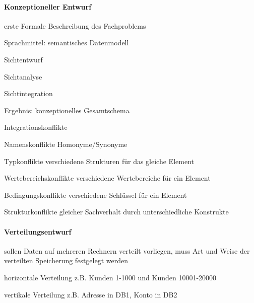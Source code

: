 \documentclass[a4paper]{article}
\begin{document}
\begin{multicols}{3}
    \paragraph{Konzeptioneller Entwurf}
    \begin{itemize*}
        \item erste Formale Beschreibung des Fachproblems
        \item Sprachmittel: semantisches Datenmodell
        \begin{itemize*}
            \item Sichtentwurf
            \item Sichtanalyse
            \item Sichtintegration
        \end{itemize*}
        \item Ergebnis: konzeptionelles Gesamtschema
        \item Integrationskonflikte
        \begin{description*}
            \item[Namenskonflikte] Homonyme/Synonyme
            \item[Typkonflikte] verschiedene Strukturen für das gleiche Element
            \item[Wertebereichskonflikte] verschiedene Wertebereiche für ein Element
            \item[Bedingungskonflikte] verschiedene Schlüssel für ein Element
            \item[Strukturkonflikte] gleicher Sachverhalt durch unterschiedliche Konstrukte
        \end{description*}
    \end{itemize*}

    \paragraph{Verteilungsentwurf}
    \begin{itemize*}
        \item sollen Daten auf mehreren Rechnern verteilt vorliegen, muss Art und Weise der verteilten Speicherung festgelegt werden
        \item horizontale Verteilung z.B. Kunden 1-1000 und Kunden 10001-20000
        \item vertikale Verteilung z.B. Adresse in DB1, Konto in DB2
    \end{itemize*}


\end{multicols}
\end{document}
